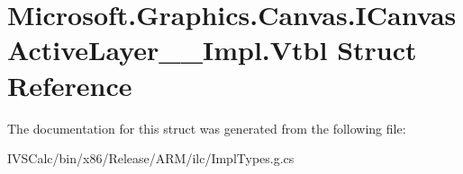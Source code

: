\hypertarget{struct_microsoft_1_1_graphics_1_1_canvas_1_1_i_canvas_active_layer_____impl_1_1_vtbl}{}\section{Microsoft.\+Graphics.\+Canvas.\+I\+Canvas\+Active\+Layer\+\_\+\+\_\+\+Impl.\+Vtbl Struct Reference}
\label{struct_microsoft_1_1_graphics_1_1_canvas_1_1_i_canvas_active_layer_____impl_1_1_vtbl}


The documentation for this struct was generated from the following file\+:\begin{DoxyCompactItemize}
\item 
I\+V\+S\+Calc/bin/x86/\+Release/\+A\+R\+M/ilc/Impl\+Types.\+g.\+cs\end{DoxyCompactItemize}
